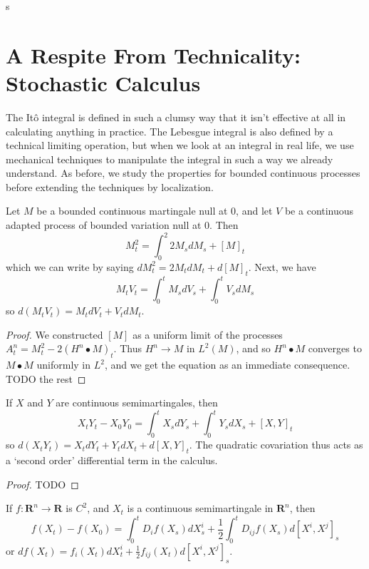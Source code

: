 s

\chapter{A Respite From Technicality: Stochastic Calculus}

The It\^{o} integral is defined in such a clumsy way that it isn't effective at all in calculating anything in practice. The Lebesgue integral is also defined by a technical limiting operation, but when we look at an integral in real life, we use mechanical techniques to manipulate the integral in such a way we already understand. As before, we study the properties for bounded continuous processes before extending the techniques by localization.

\begin{lemma}
    Let $M$ be a bounded continuous martingale null at 0, and let $V$ be a continuous adapted process of bounded variation null at 0. Then
    \[ M_t^2 = \int_0^2 2M_s dM_s + [M]_t \]
    which we can write by saying $dM_t^2 = 2M_t dM_t + d[M]_t$. Next, we have
    \[ M_t V_t = \int_0^t M_s dV_s + \int_0^t V_s dM_s \]
    so $d(M_t V_t) = M_t dV_t + V_t dM_t$.
\end{lemma}
\begin{proof}
    We constructed $[M]$ as a uniform limit of the processes $A^n_t = M_t^2 - 2 (H^n \bullet M)_t$. Thus $H^n \to M$ in $L^2(M)$, and so $H^n \bullet M$ converges to $M \bullet M$ uniformly in $L^2$, and we get the equation as an immediate consequence. TODO the rest
\end{proof}

\begin{theorem}
    If $X$ and $Y$ are continuous semimartingales, then
    \[ X_tY_t - X_0Y_0 = \int_0^t X_s dY_s + \int_0^t Y_s dX_s + [X,Y]_t \]
    so $d(X_tY_t) = X_t dY_t + Y_t dX_t + d[X,Y]_t$. The quadratic covariation thus acts as a `second order' differential term in the calculus.
\end{theorem}
\begin{proof}
    TODO
\end{proof}

\begin{theorem}[It\^{o}'s Formula]
    If $f: \mathbf{R}^n \to \mathbf{R}$ is $C^2$, and $X_t$ is a continuous semimartingale in $\mathbf{R}^n$, then
    \[ f(X_t) - f(X_0) = \int_0^t D_i f(X_s) dX^i_s + \frac{1}{2} \int_0^t D_{ij} f(X_s) d[X^i,X^j]_s \]
    or $df(X_t) = f_i(X_t) dX^i_t + \frac{1}{2} f_{ij}(X_t) d[X^i,X^j]_s$.
\end{theorem}


